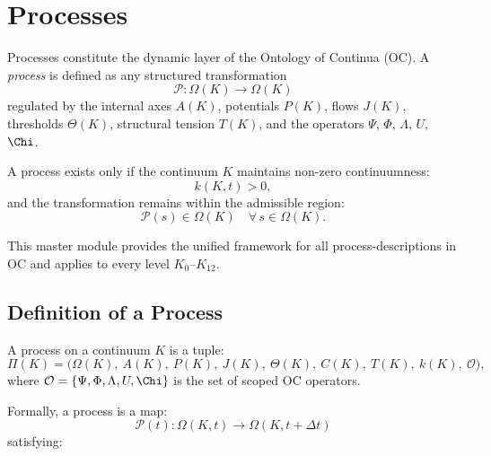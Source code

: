 

\section{Processes}
\label{sec:processes-master}

Processes constitute the dynamic layer of the Ontology of Continua (OC).
A \emph{process} is defined as any structured transformation
\[
\mathcal{P}: \Omega(K) \longrightarrow \Omega(K)
\]
regulated by the internal axes $A(K)$, potentials $P(K)$, flows $J(K)$,
thresholds $\Theta(K)$, structural tension $T(K)$, and the operators
$\Psi$, $\Phi$, $\Lambda$, $U$, $\Chi$.

A process exists only if the continuum $K$ maintains
non-zero continuumness:
\[
k(K,t) > 0,
\]
and the transformation remains within the admissible region:
\[
\mathcal{P}(s) \in \Omega(K) \quad \forall\, s \in \Omega(K).
\]

This master module provides the unified framework for all
process-descriptions in OC and applies to every level $K_0$--$K_{12}$.

\subsection{Definition of a Process}

A process on a continuum $K$ is a tuple:
\[
\Pi(K) =
\bigl(
\Omega(K),\
A(K),\
P(K),\
J(K),\
\Theta(K),\
C(K),\
T(K),\
k(K),\
\mathcal{O}
\bigr),
\]
where $\mathcal{O} = \{\Psi, \Phi, \Lambda, U, \Chi\}$ is the set of
scoped OC operators.

Formally, a process is a map:
\[
\mathcal{P}(t): \Omega(K,t) \to \Omega(K,t+\Delta t)
\]
satisfying:

